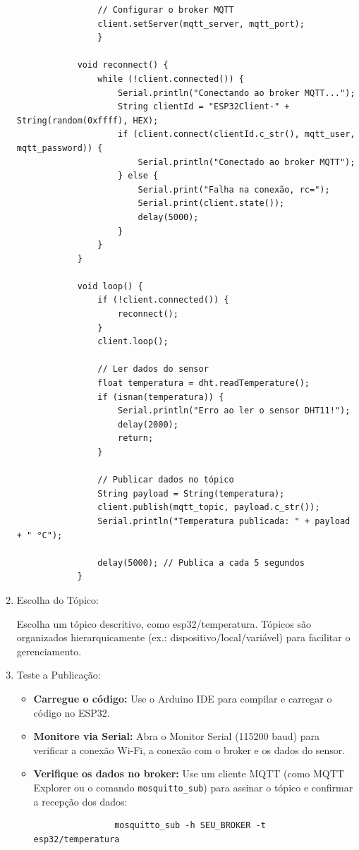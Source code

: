 \documentclass[a4paper]{article}
\begin{document}
\begin{answer}
\begin{enumerate}
\begin{verbatim}
                // Configurar o broker MQTT
                client.setServer(mqtt_server, mqtt_port);
                }

            void reconnect() {
                while (!client.connected()) {
                    Serial.println("Conectando ao broker MQTT...");
                    String clientId = "ESP32Client-" + String(random(0xffff), HEX);
                    if (client.connect(clientId.c_str(), mqtt_user, mqtt_password)) {
                        Serial.println("Conectado ao broker MQTT");
                    } else {
                        Serial.print("Falha na conexão, rc=");
                        Serial.print(client.state());
                        delay(5000);
                    }
                }
            }

            void loop() {
                if (!client.connected()) {
                    reconnect();
                }
                client.loop();

                // Ler dados do sensor
                float temperatura = dht.readTemperature();
                if (isnan(temperatura)) {
                    Serial.println("Erro ao ler o sensor DHT11!");
                    delay(2000);
                    return;
                }

                // Publicar dados no tópico
                String payload = String(temperatura);
                client.publish(mqtt_topic, payload.c_str());
                Serial.println("Temperatura publicada: " + payload + " °C");

                delay(5000); // Publica a cada 5 segundos
            }
            \end{verbatim}

            \item Escolha do Tópico:
            
            Escolha um tópico descritivo, como esp32/temperatura. Tópicos são organizados hierarquicamente (ex.: dispositivo/local/variável) para facilitar o gerenciamento.

            \item Teste a Publicação:
            \begin{itemize}
                \item \textbf{Carregue o código:} Use o Arduino IDE para compilar e carregar o código no ESP32.
                \item \textbf{Monitore via Serial:} Abra o Monitor Serial (115200 baud) para verificar a conexão Wi-Fi, a conexão com o broker e os dados do sensor.
                \item \textbf{Verifique os dados no broker:} Use um cliente MQTT (como MQTT Explorer ou o comando \texttt{mosquitto\_sub}) para assinar o tópico e confirmar a recepção dos dados:
                \begin{verbatim}
                mosquitto_sub -h SEU_BROKER -t esp32/temperatura
                \end{verbatim}
            \end{itemize}


\end{enumerate}
\end{answer}
\end{document}
